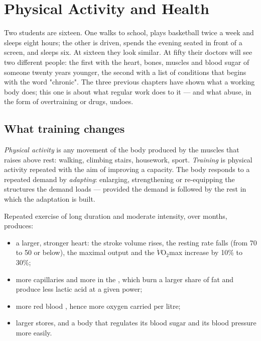 \chapter{Physical Activity and Health}\label{ch:g10:sport-and-health}

Two students are sixteen. One walks to school, plays basketball twice a
week and sleeps eight hours; the other is driven, spends the evening
seated in front of a screen, and sleeps six. At sixteen they look
similar. At fifty their doctors will see two different people: the
first with the heart, bones, muscles and blood sugar of someone twenty
years younger, the second with a list of conditions that begins with
the word "chronic". The three previous chapters have shown what a
working body does; this one is about what regular work does to it ---
and what abuse, in the form of overtraining or drugs, undoes.

\section{What training changes}

\begin{definition}\label{def:g10:sport-and-health:training}
\emph{Physical activity} is any movement of
the body produced by the muscles that raises  above
rest: walking, climbing stairs, housework, sport. \emph{Training} is
physical activity repeated with the aim of improving a capacity. The
body responds to a repeated demand by \emph{adapting}: enlarging,
strengthening or re-equipping the structures the demand loads ---
provided the demand is followed by the rest in which the adaptation
is built.
\end{definition}

\begin{proposition}\label{prop:g10:sport-and-health:endurance}
Repeated exercise of long duration and moderate intensity, over
months, produces:
\begin{itemize}
  \item a larger, stronger heart: the stroke volume rises, the resting
        rate falls (from 70 to 50 or below), the maximal output and the
        $\dot V\!\mathrm{O_2}$max increase by 10\% to 30\%;
  \item more capillaries and more  in the ,
        which burn a larger share of fat and produce less lactic acid
        at a given power;
  \item more red blood , hence more oxygen carried per litre;
  \item larger  stores, and a body that regulates its blood
        sugar and its blood pressure more easily.
\end{itemize}
\end{proposition}
\admitted

